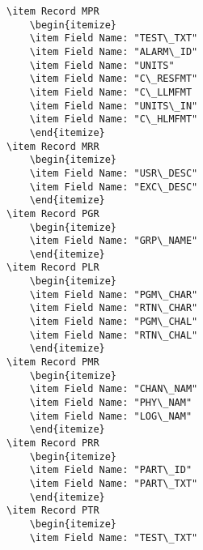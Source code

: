 \documentclass[letterpaper]{article}
\begin{document}
\begin{verbatim}
\item Record MPR
    \begin{itemize}
    \item Field Name: "TEST\_TXT"
    \item Field Name: "ALARM\_ID"
    \item Field Name: "UNITS"
    \item Field Name: "C\_RESFMT"
    \item Field Name: "C\_LLMFMT
    \item Field Name: "UNITS\_IN"
    \item Field Name: "C\_HLMFMT"
    \end{itemize}
\item Record MRR
    \begin{itemize}
    \item Field Name: "USR\_DESC"
    \item Field Name: "EXC\_DESC"
    \end{itemize}
\item Record PGR
    \begin{itemize}
    \item Field Name: "GRP\_NAME"
    \end{itemize}
\item Record PLR
    \begin{itemize}
    \item Field Name: "PGM\_CHAR"
    \item Field Name: "RTN\_CHAR"
    \item Field Name: "PGM\_CHAL"
    \item Field Name: "RTN\_CHAL"
    \end{itemize}
\item Record PMR
    \begin{itemize}
    \item Field Name: "CHAN\_NAM"
    \item Field Name: "PHY\_NAM"
    \item Field Name: "LOG\_NAM"
    \end{itemize}
\item Record PRR
    \begin{itemize}
    \item Field Name: "PART\_ID"
    \item Field Name: "PART\_TXT"
    \end{itemize}
\item Record PTR
    \begin{itemize}
    \item Field Name: "TEST\_TXT"

\end{verbatim}
\end{document}

